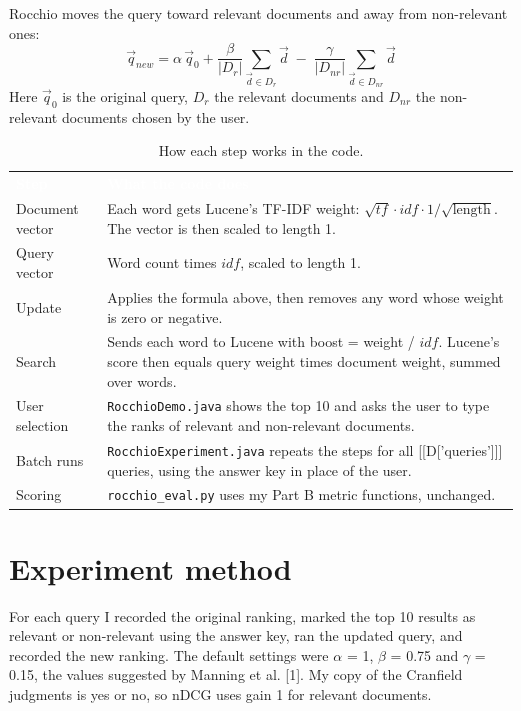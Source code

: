 Rocchio moves the query toward relevant documents and away from non-relevant ones:
\[ \vec{q}_{new} = \alpha\,\vec{q}_{0} + \frac{\beta}{|D_r|}\sum_{\vec{d}\in D_r}\vec{d} \;-\; \frac{\gamma}{|D_{nr}|}\sum_{\vec{d}\in D_{nr}}\vec{d} \]
Here $\vec{q}_0$ is the original query, $D_r$ the relevant documents and $D_{nr}$ the non-relevant documents chosen by the user.

\begin{table}[H]\small\centering\caption{How each step works in the code.}
\begin{tabularx}{\linewidth}{lY}\textcolor{white}{\textbf{Step}} & \textcolor{white}{\textbf{What the code does}} \\
Document vector & Each word gets Lucene's TF-IDF weight: $\sqrt{tf}\cdot idf\cdot 1/\sqrt{\text{length}}$. The vector is then scaled to length 1. \\
Query vector & Word count times $idf$, scaled to length 1. \\
Update & Applies the formula above, then removes any word whose weight is zero or negative. \\
Search & Sends each word to Lucene with boost = weight / $idf$. Lucene's score then equals query weight times document weight, summed over words. \\
User selection & \texttt{RocchioDemo.java} shows the top 10 and asks the user to type the ranks of relevant and non-relevant documents. \\
Batch runs & \texttt{RocchioExperiment.java} repeats the steps for all [[D['queries']]] queries, using the answer key in place of the user. \\
Scoring & \texttt{rocchio\_eval.py} uses my Part B metric functions, unchanged. \\
\hline\end{tabularx}\end{table}

\section{Experiment method}
For each query I recorded the original ranking, marked the top 10 results as relevant or non-relevant using the answer key, ran the updated query, and recorded the new ranking. The default settings were $\alpha$ = 1, $\beta$ = 0.75 and $\gamma$ = 0.15, the values suggested by Manning et al. [1]. My copy of the Cranfield judgments is yes or no, so nDCG uses gain 1 for relevant documents.

